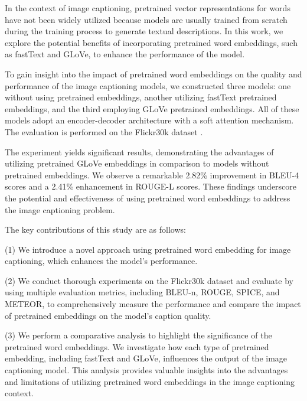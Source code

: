 \documentclass[conference]{IEEEtran}
\begin{document}
In the context of image captioning, pretrained vector representations for words have not been widely utilized because models are usually trained from scratch during the training process to generate textual descriptions. In this work, we explore the potential benefits of incorporating pretrained word embeddings, such as fastText and GLoVe, to enhance the performance of the model.



To gain insight into the impact of pretrained word embeddings on the quality and performance of the image captioning models, we constructed three models: one without using pretrained embeddings, another utilizing fastText pretrained embeddings, and the third employing GLoVe pretrained embeddings.  All of these models adopt an encoder-decoder architecture with a soft attention mechanism. The evaluation is performed on the Flickr30k dataset \cite{jia2015guiding}.%

The experiment yields significant results, demonstrating the advantages of utilizing pretrained GLoVe embeddings in comparison to models without pretrained embeddings. We observe a remarkable 2.82\% improvement in BLEU-4 scores and a 2.41\% enhancement in ROUGE-L scores. These findings underscore the potential and effectiveness of using pretrained word embeddings to address the image captioning problem.


The key contributions of this study are as follows:


(1) We introduce a novel approach using pretrained word embedding for image captioning, which enhances the model's performance.


(2) We conduct thorough experiments on the Flickr30k dataset and evaluate by using multiple evaluation metrics, including BLEU-n, ROUGE, SPICE, and METEOR, to comprehensively measure the performance and compare the impact of pretrained embeddings on the model's caption quality.


(3) We perform a comparative analysis to highlight the significance of the pretrained word embeddings. We investigate how each type of pretrained embedding, including fastText and GLoVe, influences the output of the image captioning model. This analysis provides valuable insights into the advantages and limitations of utilizing pretrained word embeddings in the image captioning context.
\end{document}
